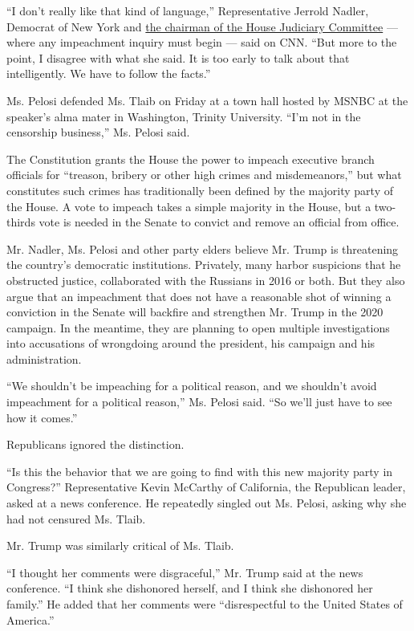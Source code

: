 ``I don't really like that kind of language,'' Representative Jerrold
Nadler, Democrat of New York and
\href{https://www.nytimes3xbfgragh.onion/2018/11/30/us/politics/jerrold-nadler-trump-impeachment.html}{the
chairman of the House Judiciary Committee} --- where any impeachment
inquiry must begin --- said on CNN. ``But more to the point, I disagree
with what she said. It is too early to talk about that intelligently. We
have to follow the facts.''

Ms. Pelosi defended Ms. Tlaib on Friday at a town hall hosted by MSNBC
at the speaker's alma mater in Washington, Trinity University. ``I'm not
in the censorship business,'' Ms. Pelosi said.

The Constitution grants the House the power to impeach executive branch
officials for ``treason, bribery or other high crimes and
misdemeanors,'' but what constitutes such crimes has traditionally been
defined by the majority party of the House. A vote to impeach takes a
simple majority in the House, but a two-thirds vote is needed in the
Senate to convict and remove an official from office.

Mr. Nadler, Ms. Pelosi and other party elders believe Mr. Trump is
threatening the country's democratic institutions. Privately, many
harbor suspicions that he obstructed justice, collaborated with the
Russians in 2016 or both. But they also argue that an impeachment that
does not have a reasonable shot of winning a conviction in the Senate
will backfire and strengthen Mr. Trump in the 2020 campaign. In the
meantime, they are planning to open multiple investigations into
accusations of wrongdoing around the president, his campaign and his
administration.

``We shouldn't be impeaching for a political reason, and we shouldn't
avoid impeachment for a political reason,'' Ms. Pelosi said. ``So we'll
just have to see how it comes.''

Republicans ignored the distinction.

``Is this the behavior that we are going to find with this new majority
party in Congress?'' Representative Kevin McCarthy of California, the
Republican leader, asked at a news conference. He repeatedly singled out
Ms. Pelosi, asking why she had not censured Ms. Tlaib.

Mr. Trump was similarly critical of Ms. Tlaib.

``I thought her comments were disgraceful,'' Mr. Trump said at the news
conference. ``I think she dishonored herself, and I think she dishonored
her family.'' He added that her comments were ``disrespectful to the
United States of America.''

